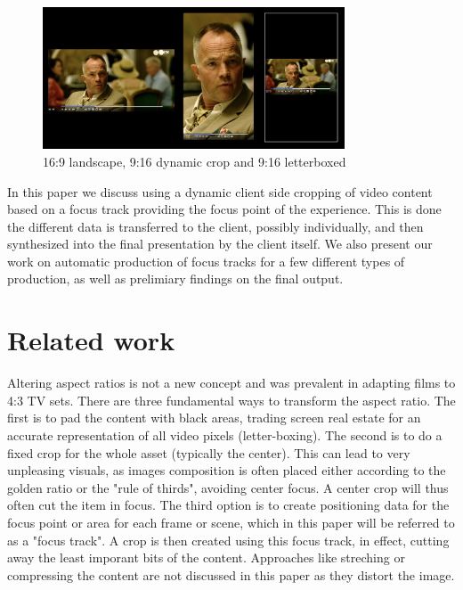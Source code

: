 \documentclass[sigconf, review=false]{acmart}
\begin{document}
\begin{figure}
  \begin{center}
    \includegraphics[width=0.8\textwidth]{DAR_vs_letterbox.png}
  \end{center}
  \caption{16:9 landscape, 9:16 dynamic crop and 9:16 letterboxed}
  \label{croppings}
\end{figure}

In this paper we discuss using a dynamic client side cropping of video content
based on a focus track providing the focus point of the experience. This is
done the different data is transferred to the client, possibly individually,
and then synthesized into the final presentation by the client itself. We
also present our work on automatic production of focus tracks for a few
different types of production, as well as prelimiary findings on the final
output.

\section{Related work}

Altering aspect ratios is not a new concept and was prevalent in adapting
films to 4:3 TV sets. There are three fundamental ways to transform the
aspect ratio. The first is to pad the content with black areas, trading
screen real estate for an accurate representation of all video pixels
(letter-boxing). The second is to do a fixed crop for the whole asset
(typically the center). This can lead to very unpleasing visuals, as images
composition is often placed either according to the golden ratio or the "rule
of thirds", avoiding center focus. A center crop will thus often cut the item
in focus. The third option is to create positioning data for the focus point
or area for each frame or scene, which in this paper will be referred to as
a "focus track". A crop is then created using this focus track, in effect,
cutting away the least imporant bits of the content. Approaches like
streching or compressing the content are not discussed in this paper as they
distort the image.
\end{document}
